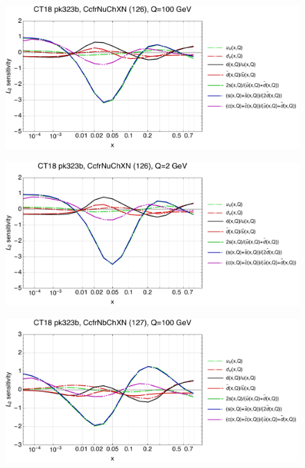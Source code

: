 \documentclass[10pt,aps,prd,floatfix,titlepage]{revtex4}
\begin{document}
\clearpage
\begin{figure}
\includegraphics[width=\textwidth,height=0.44\textheight,keepaspectratio]{2/126_ct18nn_q100_Sf_2.pdf}
\caption{}
\end{figure}
\begin{figure}
\includegraphics[width=\textwidth,height=0.44\textheight,keepaspectratio]{2/126_ct18nn_q2_Sf_2.pdf}
\caption{}
\end{figure}
\clearpage
\begin{figure}
\includegraphics[width=\textwidth,height=0.44\textheight,keepaspectratio]{2/127_ct18nn_q100_Sf_2.pdf}
\caption{}
\end{figure}
\end{document}
